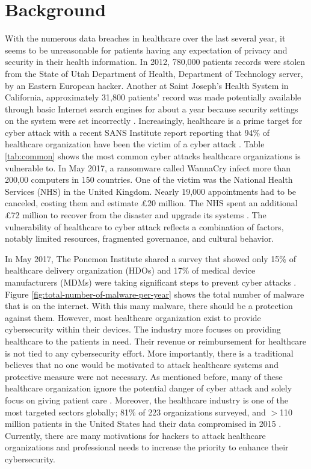 \documentclass[pdf,bookmarks,colorlinks=true]{IEEEtran}
\begin{document}
\section{Background}
\label{sec:Background}
With the numerous data breaches in healthcare over the last several year, it seems to be unreasonable for patients having any expectation of privacy and security in their health information. In 2012, 780,000 patients records were stolen from the State of Utah Department of Health, Department of Technology server, by an Eastern European hacker. Another at Saint Joseph's Health System in California, approximately 31,800 patients' record was made potentially available through basic Internet search engines for about a year because security settings on the system were set incorrectly \cite{murphy2015cybersecurity}. Increasingly, healthcare is a prime target for cyber attack with a recent SANS Institute report reporting that 94\% of healthcare organization have been the victim of a cyber attack \cite{williams2015cybersecurity}. Table \ref{tab:common} shows the most common cyber attacks healthcare organizations is vulnerable to. In May 2017, a ransomware called WannaCry infect more than 200,00 computers in 150 countries. One of the victim was the National Health Services (NHS) in the United Kingdom. Nearly 19,000 appointments had to be canceled, costing them and estimate \pounds20 million. The NHS spent an additional \pounds72 million to recover from the disaster and upgrade its systems \cite{ferrara2019cybersecurity}. The vulnerability of healthcare to cyber attack reflects a combination of factors, notably limited resources, fragmented governance, and cultural behavior. \par
In May 2017, The Ponemon Institute shared a survey that showed only 15\% of healthcare delivery organization (HDOs) and 17\% of medical device manufacturers (MDMs) were taking significant steps to prevent cyber attacks \cite{busdicker2017role}. Figure \ref{fig:total-number-of-malware-per-year} shows the total number of malware that is on the internet. With this many malware, there should be a protection against them. However, most healthcare organization exist to provide cybersecurity within their devices. The industry more focuses on providing healthcare to the patients in need. Their revenue or reimbursement for healthcare is not tied to any cybersecurity effort. More importantly, there is a traditional believes that no one would be motivated to attack healthcare systems and protective measure were not necessary. As mentioned before, many of these healthcare organization ignore the potential danger of cyber attack and solely focus on giving patient care \cite{coventry2018cybersecurity}. Moreover, the healthcare industry is one of the most targeted sectors globally; 81\% of 223 organizations surveyed, and $>$110 million patients in the United States had their data compromised in 2015 \cite{martin2017cybersecurity}. Currently, there are many motivations for hackers to attack healthcare organizations and professional needs to increase the priority to enhance their cybersecurity.
\end{document}

